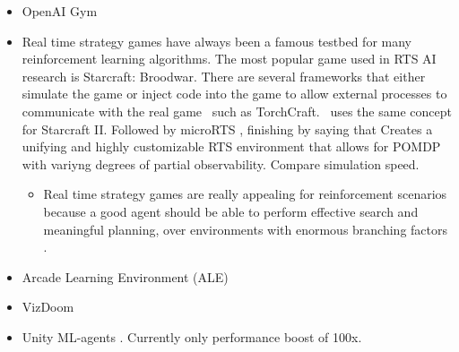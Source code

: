 
\begin{itemize}
\item OpenAI Gym \citep{Brockman2016}
\item Real time strategy games have always been a famous testbed for many reinforcement learning algorithms. The most popular game used in RTS AI research is Starcraft: Broodwar. There are several frameworks that either simulate the game \citep{Broodwar, Wender2012} or inject code into the game to allow external processes to communicate with the real game~\citep{Synnaeve2016} such as TorchCraft.~\cite{Vinyals2017} uses the same concept for Starcraft II\@. Followed by microRTS \citep{Ontanon2013}, finishing by saying that \citep{Andersen2017} Creates a unifying and highly customizable RTS environment that allows for POMDP with variyng degrees of partial observability. Compare simulation speed.
    \begin{itemize}
    \item Real time strategy games are really appealing for reinforcement scenarios because a good agent should be able to perform effective search and meaningful planning, over environments with enormous branching factors \citep{Soemers2014}\citep{Wender2012}. 
    \end{itemize}
\item Arcade Learning Environment (ALE) \citep{Bellemare2015}
\item VizDoom \citep{Kempka2017}
\item Unity ML-agents \citep{UnityMLAgents}. Currently only performance boost of 100x.
\end{itemize}
